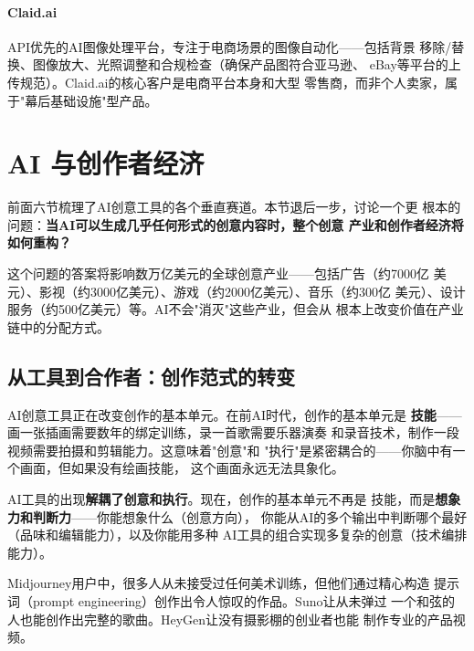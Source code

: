 \paragraph{Claid.ai}
API优先的AI图像处理平台，专注于电商场景的图像自动化——包括背景
移除/替换、图像放大、光照调整和合规检查（确保产品图符合亚马逊、
eBay等平台的上传规范）。Claid.ai的核心客户是电商平台本身和大型
零售商，而非个人卖家，属于"幕后基础设施"型产品。



\section{AI 与创作者经济}
\label{sec:create-creator-economy}

前面六节梳理了AI创意工具的各个垂直赛道。本节退后一步，讨论一个更
根本的问题：\textbf{当AI可以生成几乎任何形式的创意内容时，整个创意
产业和创作者经济将如何重构？}

这个问题的答案将影响数万亿美元的全球创意产业——包括广告（约7000亿
美元）、影视（约3000亿美元）、游戏（约2000亿美元）、音乐（约300亿
美元）、设计服务（约500亿美元）等。AI不会"消灭"这些产业，但会从
根本上改变价值在产业链中的分配方式。

\subsection{从工具到合作者：创作范式的转变}
\label{subsec:create-paradigm}

AI创意工具正在改变创作的基本单元。在前AI时代，创作的基本单元是
\textbf{技能}——画一张插画需要数年的绑定训练，录一首歌需要乐器演奏
和录音技术，制作一段视频需要拍摄和剪辑能力。这意味着"创意"和
"执行"是紧密耦合的——你脑中有一个画面，但如果没有绘画技能，
这个画面永远无法具象化。

AI工具的出现\textbf{解耦了创意和执行}。现在，创作的基本单元不再是
技能，而是\textbf{想象力和判断力}——你能想象什么（创意方向），
你能从AI的多个输出中判断哪个最好（品味和编辑能力），以及你能用多种
AI工具的组合实现多复杂的创意（技术编排能力）。

Midjourney用户中，很多人从未接受过任何美术训练，但他们通过精心构造
提示词（prompt engineering）创作出令人惊叹的作品。Suno让从未弹过
一个和弦的人也能创作出完整的歌曲。HeyGen让没有摄影棚的创业者也能
制作专业的产品视频。

